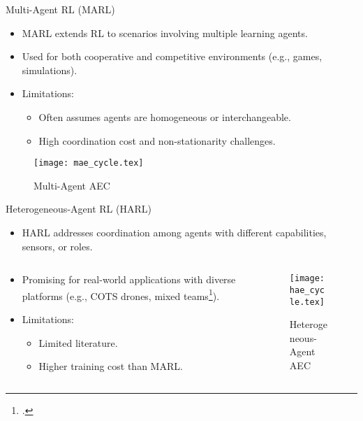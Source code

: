 \documentclass[xcolor={svgnames},aspectratio=169]{beamer}
\begin{document}
\begin{frame}{Multi-Agent RL (MARL)}
    \begin{itemize}
        \item MARL extends RL to scenarios involving multiple learning agents.
        \item Used for both cooperative and competitive environments (e.g., games, simulations).
        \item Limitations:
        \begin{itemize}
            \item Often assumes agents are homogeneous or interchangeable.
            \item High coordination cost and non-stationarity challenges.
        \end{itemize}
    \end{itemize}
    \begin{figure}[!h]
        \centering
        \texttt{[image: mae\_cycle.tex]}
        \caption{Multi-Agent AEC}
        \label{fig:marl_aec}
    \end{figure}
\end{frame}

\begin{frame}{Heterogeneous-Agent RL (HARL)}
    \begin{itemize}
        \item HARL addresses coordination among agents with different 
            capabilities, sensors, or roles.
    \end{itemize}
    \begin{columns}
        \begin{column}{.35\textwidth}
            \begin{itemize}
                \item Promising for real-world applications with diverse platforms 
                    (e.g., COTS drones, mixed teams\footcite{guo2024}).
                \item Limitations:
                \begin{itemize}
                    \item Limited literature.
                    \item Higher training cost than MARL.
                \end{itemize}
            \end{itemize}
            \hfil
        \end{column}
        \begin{column}{.6\textwidth}
            \begin{figure}[!h]
                \centering
                \texttt{[image: hae\_cycle.tex]}
                \caption{Heterogeneous-Agent AEC}
                \label{fig:harl_aec}
            \end{figure}
        \end{column}
    \end{columns}
\end{frame}
\end{document}
